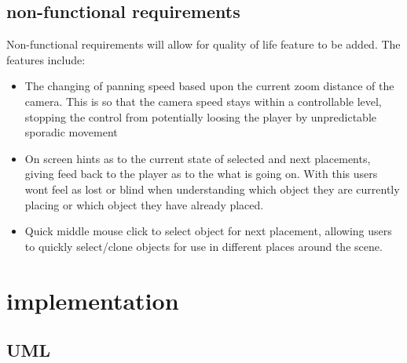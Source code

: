 \subsection{non-functional requirements}
Non-functional requirements will allow for quality of life feature to be added. The features include:
\begin{itemize}
	\item The changing of panning speed based upon the current zoom distance of the camera. This is so that the camera speed stays within a controllable level, stopping the control from potentially loosing the player by unpredictable sporadic movement
	\item On screen hints as to the current state of selected and next placements, giving feed back to the player as to the what is going on. With this users wont feel as lost or blind when understanding which object they are currently placing or which object they have already placed.
	\item Quick middle mouse click to select object for next placement, allowing users to quickly select/clone objects for use in different places around the scene.
\end{itemize}







\section{implementation}
\subsection{UML}
